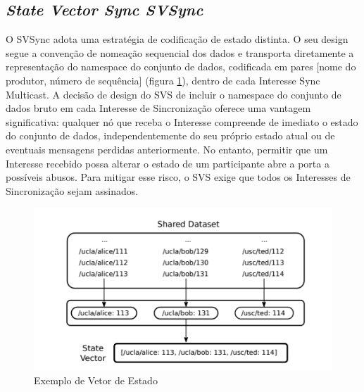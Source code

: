 \subsection{\emph{\textit{State Vector Sync} \gls{SVSync}}}
\label{sub:Sinc__NDN}

O \gls{SVSync} adota uma estratégia de codificação de estado distinta. O seu design segue a convenção de nomeação sequencial dos dados e transporta diretamente a representação do namespace do conjunto de dados, codificada em pares [nome do produtor, número de sequência] (figura \ref{fig:SVs}), dentro de cada Interesse Sync Multicast.
A decisão de design do SVS de incluir o namespace do conjunto de dados bruto em cada Interesse de Sincronização oferece uma vantagem significativa: qualquer nó que receba o Interesse compreende de imediato o estado do conjunto de dados, independentemente do seu próprio estado atual ou de eventuais mensagens perdidas anteriormente. No entanto, permitir que um Interesse recebido possa alterar o estado de um participante abre a porta a possíveis abusos. Para mitigar esse risco, o SVS exige que todos os Interesses de Sincronização sejam assinados.

\begin{figure}[h]
    \centering
    \includegraphics{Chapters/Figures/vsvsync.png}
    \caption{Exemplo de Vetor de Estado \cite{moll_brief_nodate}} 
    \label{fig:SVs}   
\end{figure}

